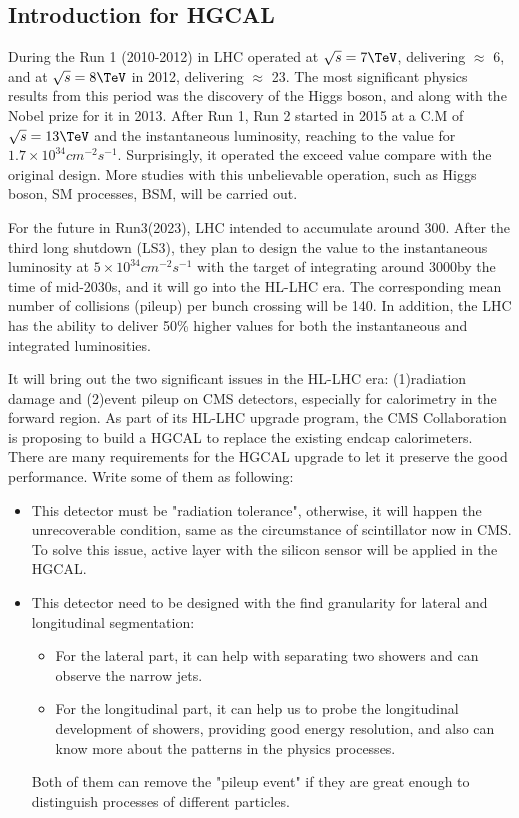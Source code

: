 \subsection{Introduction for HGCAL}
During the Run 1 (2010-2012) in LHC operated at $\sqrt{s} = 7\TeV$, delivering $\approx$ 6\fbinv, and at $\sqrt{s} = 8\TeV$ in 2012, delivering $\approx$ 23\fbinv. The most significant physics results from this period was the discovery of the Higgs boson, and along with the Nobel prize for it in 2013. After Run 1, Run 2 started in 2015 at a C.M of $\sqrt{s} = 13\TeV$  and the instantaneous luminosity, reaching to the value for $1.7 \times 10^{34} cm^{-2} s^{-1}$. Surprisingly, it operated the exceed value compare with the original design. More studies with this unbelievable operation, such as Higgs boson, SM processes, BSM, will be carried out.

For the future in Run3(2023), LHC intended to accumulate around 300\fbinv. After the third long shutdown (LS3), they plan to design the value to the instantaneous luminosity at $5 \times 10^{34} cm^{-2} s^{-1}$ with the target of integrating around 3000\fbinv by the time of mid-2030s, and it will go into the HL-LHC era. The corresponding mean number of collisions (pileup) per bunch crossing will be 140. In addition, the LHC has the ability to deliver 50\% higher values for both the instantaneous and integrated luminosities.

It will bring out the two significant issues in the HL-LHC era: (1)radiation damage and (2)event pileup on CMS detectors, especially for calorimetry in the forward region. As part of its HL-LHC upgrade program, the CMS Collaboration is proposing to build a HGCAL to replace the existing endcap calorimeters. There are many requirements for the HGCAL upgrade to let it preserve the good performance. Write some of them as following:
\begin{itemize}
\item  This detector must be "radiation tolerance", otherwise, it will happen the unrecoverable condition, same as the circumstance of scintillator now in CMS. To solve this issue, active layer with the silicon sensor will be applied in the HGCAL.
\item  This detector need to be designed with the find granularity for lateral and longitudinal segmentation:
\begin{itemize}
\item For the lateral part, it can help with separating two showers and can observe the narrow jets. 
\item For the longitudinal part, it can help us to probe the longitudinal development of showers, providing good energy resolution, and also can know more about the patterns in the physics processes.
\end{itemize}
Both of them can remove the "pileup event" if they are great enough to distinguish processes of different particles.
\end{itemize}

